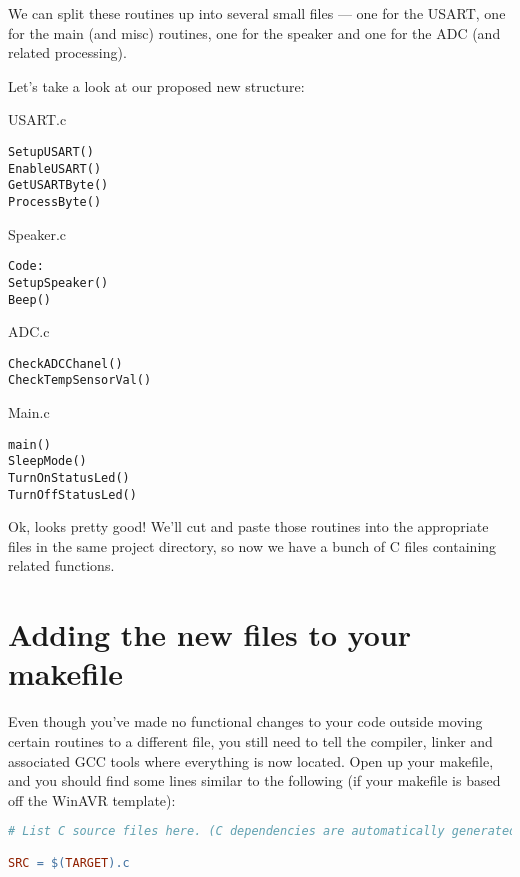 \documentclass[a4paper,oneside]{book}
\begin{document}
We can split these routines up into several small files --- one for the USART, one for the main (and misc) routines, one for the speaker and one for the ADC (and related processing).

Let's take a look at our proposed new structure:

USART.c
\begin{center}
\begin{lstlisting}
SetupUSART()
EnableUSART()
GetUSARTByte()
ProcessByte()
\end{lstlisting}
\end{center}

Speaker.c
\begin{center}
\begin{lstlisting}
Code:
SetupSpeaker()
Beep()
\end{lstlisting}
\end{center}

ADC.c
\begin{center}
\begin{lstlisting}
CheckADCChanel()
CheckTempSensorVal()
\end{lstlisting}
\end{center}

Main.c
\begin{center}
\begin{lstlisting}
main()
SleepMode()
TurnOnStatusLed()
TurnOffStatusLed()
\end{lstlisting}
\end{center}

Ok, looks pretty good! We'll cut and paste those routines into the appropriate files in the same project directory, so now we have a bunch of C files containing related functions.

\section{Adding the new files to your makefile}

Even though you've made no functional changes to your code outside moving certain routines to a different file, you still need to tell the compiler, linker and associated GCC tools where everything is now located. Open up your makefile, and you should find some lines similar to the following (if your makefile is based off the WinAVR template):

\begin{center}
\begin{lstlisting}[language=make]
# List C source files here. (C dependencies are automatically generated.)

SRC = $(TARGET).c
\end{lstlisting}
\end{center}
\end{document}
